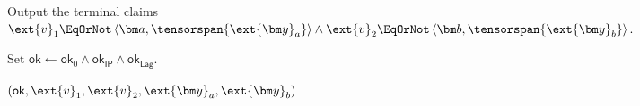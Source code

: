 \begin{algorithm}[!t]
Output the terminal claims
\(
    \ext{v}_1
    \EqOrNot
    \left\langle
        \bm a,
        \tensorspan{\ext{\bm y}_a}
    \right\rangle
    \wedge
    \ext{v}_2
    \EqOrNot
    \left\langle
        \bm b,
        \tensorspan{\ext{\bm y}_b}
    \right\rangle.
\)\;

Set
\(
    \mathsf{ok}
    \leftarrow
    \mathsf{ok}_0
    \wedge
    \mathsf{ok}_{\mathsf{IP}}
    \wedge
    \mathsf{ok}_{\mathsf{Lag}}.
\)

\Return
\(
    (
        \mathsf{ok},
        \ext{v}_1,
        \ext{v}_2,
        \ext{\bm y}_a,
        \ext{\bm y}_b
    )
\)\;
\end{algorithm}
